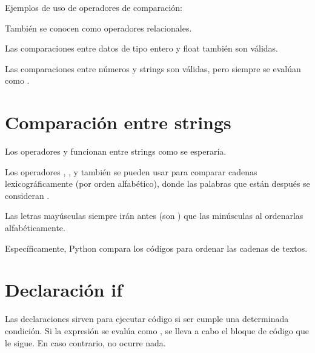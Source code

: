 Ejemplos de uso de operadores de comparación:


También se conocen como operadores relacionales.
\medskip

Las comparaciones entre datos de tipo entero y float también son válidas.


Las comparaciones entre números y strings son válidas, pero siempre se evalúan como .


\section{Comparación entre strings}

Los operadores \ttt{==} y \ttt{!=} funcionan entre strings como se esperaría.


Los operadores \ttt{>}, \ttt{<}, \ttt{>=} y \ttt{<=} también se pueden usar para comparar cadenas lexicográficamente (por orden alfabético), donde las palabras que están después se consideran .


Las letras mayúsculas siempre irán antes (son ) que las minúsculas al ordenarlas alfabéticamente.


Específicamente, Python compara los códigos  para ordenar las cadenas de textos.

\section{Declaración if}

Las declaraciones  sirven para ejecutar código si ser cumple una determinada condición.
Si la expresión se evalúa como , se lleva a cabo el bloque de código que le sigue.
En caso contrario, no ocurre nada.

